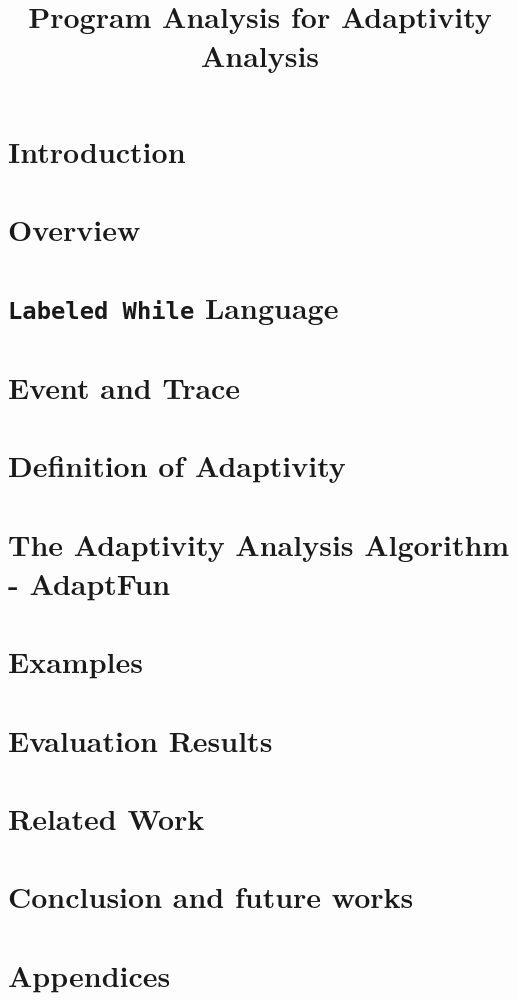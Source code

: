 \documentclass[a4paper,11pt]{article}
\newcommand{\THESYSTEM}{\textsf{AdaptFun}}
\begin{document}
\title{Program Analysis for Adaptivity Analysis}

\author{}

\date{}

\maketitle
%
\tableofcontents


\section{Introduction}
\label{sec:intro}

\section{Overview}
\label{sec:overview}


\section{{\tt Labeled While} Language}
\label{sec:language}

\clearpage
\section{Event and Trace}


\clearpage
\section{Definition of Adaptivity}
\label{sec:adaptivity}

\clearpage
\section{The Adaptivity Analysis Algorithm - {\THESYSTEM}}
\label{sec:algorithm}


\section{Examples}
\label{sec:examples}


\section{Evaluation Results}



\section{Related Work}

\section{Conclusion and future works}


%
\clearpage
\appendix
{}
\section*{Appendices}



\end{document}
